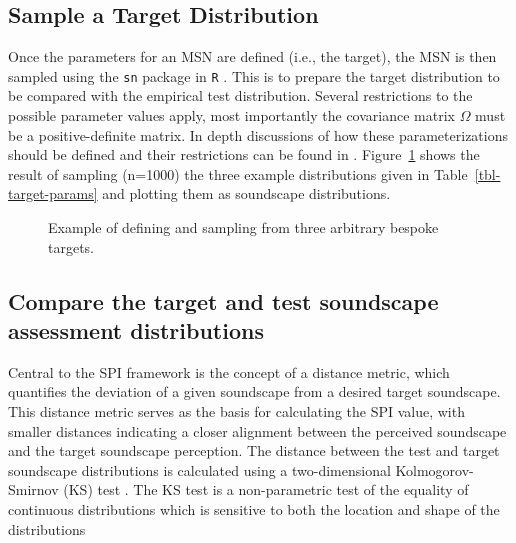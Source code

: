 \documentclass[
  authoryear,
  preprint,
  3p]{elsarticle}
\begin{document}
\subsection{Sample a Target
Distribution}\label{sample-a-target-distribution}

Once the parameters for an MSN are defined (i.e., the target), the MSN
is then sampled using the \texttt{sn} package \citep{Azzalini2021R} in
\texttt{R} \citep{RCT2018R}. This is to prepare the target distribution
to be compared with the empirical test distribution. Several
restrictions to the possible parameter values apply, most importantly
the covariance matrix \(\Omega\) must be a positive-definite matrix. In
depth discussions of how these parameterizations should be defined and
their restrictions can be found in \citet{Azzalini2016How}.
Figure~\ref{fig-targets} shows the result of sampling (n=1000) the three
example distributions given in Table~\ref{tbl-target-params} and
plotting them as soundscape distributions.

\begin{figure}[H]


\caption{\label{fig-targets}Example of defining and sampling from three
arbitrary bespoke targets.}

\end{figure}%

\subsection{Compare the target and test soundscape assessment
distributions}\label{compare-the-target-and-test-soundscape-assessment-distributions}

Central to the SPI framework is the concept of a distance metric, which
quantifies the deviation of a given soundscape from a desired target
soundscape. This distance metric serves as the basis for calculating the
SPI value, with smaller distances indicating a closer alignment between
the perceived soundscape and the target soundscape perception. The
distance between the test and target soundscape distributions is
calculated using a two-dimensional Kolmogorov-Smirnov (KS) test
\citep{Fasano1987multidimensional}. The KS test is a non-parametric test
of the equality of continuous distributions which is sensitive to both
the location and shape of the distributions
\citep{Chakravati1967Handbook}
\end{document}

